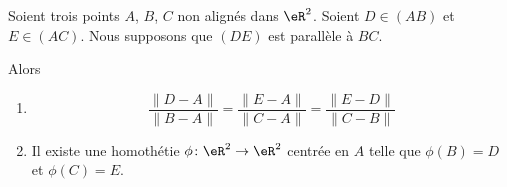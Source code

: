 \begin{theorem}     \label{THOooFMMLooLmAnAd}
	Soient trois points \( A\), \( B\), \( C\) non alignés dans \( \eR^2\). Soient \( D\in (AB)\) et \( E\in (AC)\). Nous supposons que \( (DE)\) est parallèle à \( BC\).

	Alors
	\begin{enumerate}
		\item
		      \begin{equation}		\label{EQooRDBYooEXWwGl}
			      \frac{ \| D-A \| }{ \| B-A \| }=\frac{ \| E-A \| }{ \| C-A \| }=\frac{ \| E-D \| }{ \| C-B \| }
		      \end{equation}
		\item
		      Il existe une homothétie \( \phi\colon \eR^2\to \eR^2\) centrée en \( A\) telle que \( \phi(B)=D\) et \( \phi(C)=E\).
	\end{enumerate}
\end{theorem}

